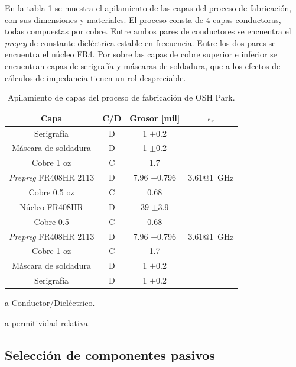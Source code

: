 En la tabla \ref{tab:oshpark_4_layer_stackup} se muestra el apilamiento de las
capas del proceso de fabricación, con sus dimensiones y materiales. El proceso
consta de 4 capas conductoras, todas compuestas por cobre. Entre ambos pares de
conductores se encuentra el \textit{prepeg} de constante dieléctrica estable en
frecuencia. Entre los dos pares se encuentra el núcleo FR4. Por sobre las capas de
cobre superior e inferior se encuentran capas de serigrafía y máscaras de
soldadura, que a los efectos de cálculos de impedancia tienen un rol
despreciable.

\begin{table}[htbp]
\centering
\begin{threeparttable}[b]
    \begin{tabular}{c|c|c|c}
        Capa & C/D \tnote{a} & Grosor [mil]  & $\epsilon_r$ \tnote{b} \\
        \hline
        Serigrafía & D & 1 $\pm$0.2 & \\
        Máscara de soldadura & D & 1 $\pm$0.2 & \\
        Cobre 1 oz & C & 1.7 \\
        \textit{Prepreg} FR408HR 2113  & D & 7.96 $\pm$0.796 &
        3.61@\qty{1}{\giga\hertz} \\
        Cobre 0.5 oz & C & 0.68 & \\
        Núcleo FR408HR & D & 39 $\pm$3.9 & \\
        Cobre 0.5 & C & 0.68 \\
        \textit{Prepreg} FR408HR 2113 & D & 7.96 $\pm$0.796 &
        3.61@\qty{1}{\giga\hertz}\\
        Cobre 1 oz & C & 1.7 & \\
        Máscara de soldadura & D & 1 $\pm$0.2 & \\
        Serigrafía & D & 1 $\pm$0.2 & \\
    \end{tabular}
    \begin{tablenotes}
        \item [a] Conductor/Dieléctrico.
        \item [a] permitividad relativa.
    \end{tablenotes}
\end{threeparttable}
\caption{Apilamiento de capas del proceso de fabricación de OSH Park.}
\label{tab:oshpark_4_layer_stackup}
\end{table}

\subsection{Selección de componentes pasivos}

